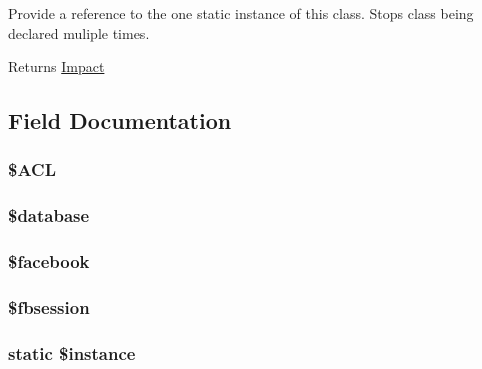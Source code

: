Provide a reference to the one static instance of this class. Stops class being declared muliple times.

\begin{DoxyReturn}{Returns}
\hyperlink{namespaceImpact}{Impact} 
\end{DoxyReturn}


\subsection{Field Documentation}
\hypertarget{classImpact__Base_a0e6e927aed984ad8947f77bf803b70bb}{
\subsubsection[{\$ACL}]{\setlength{\rightskip}{0pt plus 5cm}\${\bf ACL}}}
\label{classImpact__Base_a0e6e927aed984ad8947f77bf803b70bb}
\hypertarget{classImpact__Base_a7691c0162d89de0b6ba47edcd8ba8878}{
\subsubsection[{\$database}]{\setlength{\rightskip}{0pt plus 5cm}\$database}}
\label{classImpact__Base_a7691c0162d89de0b6ba47edcd8ba8878}
\hypertarget{classImpact__Base_a4b9bb5e9f7a5ea9381bdbe31c44e9339}{
\subsubsection[{\$facebook}]{\setlength{\rightskip}{0pt plus 5cm}\$facebook}}
\label{classImpact__Base_a4b9bb5e9f7a5ea9381bdbe31c44e9339}
\hypertarget{classImpact__Base_a92c4441a7b5fe8069992f5a4a29f24fe}{
\subsubsection[{\$fbsession}]{\setlength{\rightskip}{0pt plus 5cm}\$fbsession}}
\label{classImpact__Base_a92c4441a7b5fe8069992f5a4a29f24fe}
\hypertarget{classImpact__Base_a6438a1b53245abfe71a285472f24934d}{
\subsubsection[{\$instance}]{\setlength{\rightskip}{0pt plus 5cm}static \$instance}}
